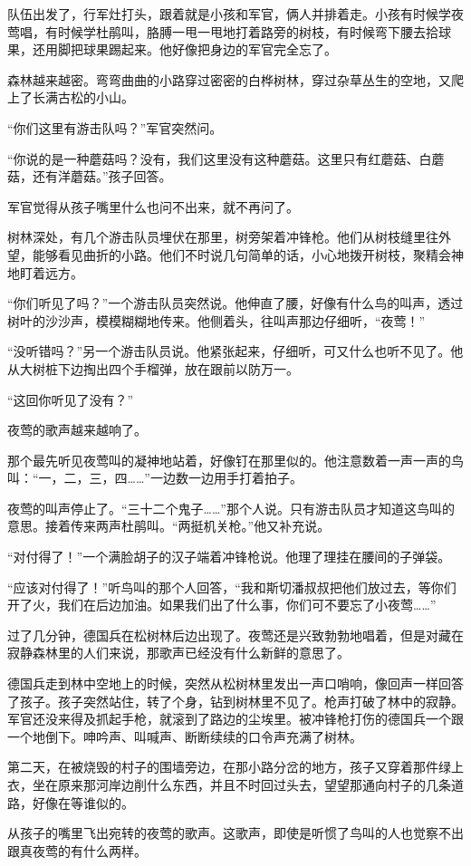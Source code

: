\documentclass[12pt,UTF-8,openany]{ctexbook}
\begin{document}
\begin{Large}
    队伍出发了，行军灶打头，跟着就是小孩和军官，俩人并排着走。小孩有时候学夜莺唱，有时候学杜鹃叫，胳膊一甩一甩地打着路旁的树枝，有时候弯下腰去拾球果，还用脚把球果踢起来。他好像把身边的军官完全忘了。
    
    森林越来越密。弯弯曲曲的小路穿过密密的白桦树林，穿过杂草丛生的空地，又爬上了长满古松的小山。
    
    “你们这里有游击队吗？”军官突然问。
    
    “你说的是一种蘑菇吗？没有，我们这里没有这种蘑菇。这里只有红蘑菇、白蘑菇，还有洋蘑菇。”孩子回答。
    
    军官觉得从孩子嘴里什么也问不出来，就不再问了。
    
    树林深处，有几个游击队员埋伏在那里，树旁架着冲锋枪。他们从树枝缝里往外望，能够看见曲折的小路。他们不时说几句简单的话，小心地拨开树枝，聚精会神地盯着远方。
    
    “你们听见了吗？”一个游击队员突然说。他伸直了腰，好像有什么鸟的叫声，透过树叶的沙沙声，模模糊糊地传来。他侧着头，往叫声那边仔细听，“夜莺！”
    
    “没听错吗？”另一个游击队员说。他紧张起来，仔细听，可又什么也听不见了。他从大树桩下边掏出四个手榴弹，放在跟前以防万一。
    
    “这回你听见了没有？”
    
    夜莺的歌声越来越响了。
    
    那个最先听见夜莺叫的凝神地站着，好像钉在那里似的。他注意数着一声一声的鸟叫：“一，二，三，四……”一边数一边用手打着拍子。
    
    夜莺的叫声停止了。“三十二个鬼子……”那个人说。只有游击队员才知道这鸟叫的意思。接着传来两声杜鹃叫。“两挺机关枪。”他又补充说。
    
    “对付得了！”一个满脸胡子的汉子端着冲锋枪说。他理了理挂在腰间的子弹袋。
    
    “应该对付得了！”听鸟叫的那个人回答，“我和斯切潘叔叔把他们放过去，等你们开了火，我们在后边加油。如果我们出了什么事，你们可不要忘了小夜莺……”
    
    过了几分钟，德国兵在松树林后边出现了。夜莺还是兴致勃勃地唱着，但是对藏在寂静森林里的人们来说，那歌声已经没有什么新鲜的意思了。
    
    德国兵走到林中空地上的时候，突然从松树林里发出一声口哨响，像回声一样回答了孩子。孩子突然站住，转了个身，钻到树林里不见了。枪声打破了林中的寂静。军官还没来得及抓起手枪，就滚到了路边的尘埃里。被冲锋枪打伤的德国兵一个跟一个地倒下。呻吟声、叫喊声、断断续续的口令声充满了树林。
    
    第二天，在被烧毁的村子的围墙旁边，在那小路分岔的地方，孩子又穿着那件绿上衣，坐在原来那河岸边削什么东西，并且不时回过头去，望望那通向村子的几条道路，好像在等谁似的。
    
    从孩子的嘴里飞出宛转的夜莺的歌声。这歌声，即使是听惯了鸟叫的人也觉察不出跟真夜莺的有什么两样。
    
\end{Large}
\end{document}
